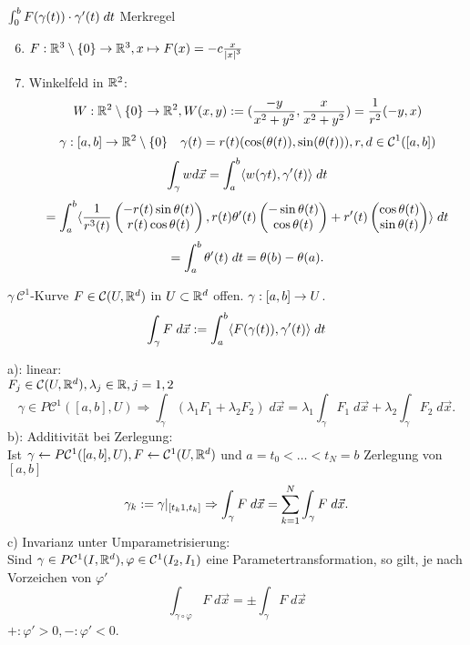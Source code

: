 \documentclass[../ana2.tex]{subfiles}
\begin{document}
\(\integralx{F(\gamma(t))\cdot \gamma'(t)}{0}{b}{t}\) Merkregel
\begin{bsp}\leavevmode
    \begin{enumerate}
        \setcounter{enumi}{5}
        \item \( \abb{F}{\R^3 \setminus \set{0}}{\R^3}, x \mapsto F(x) = -c \frac{x}{\abs{x}^3} \)
        \item Winkelfeld in \( \R^2 \): 
        \[ \abb{W}{\R^2 \setminus \set{0}}{\R^2}, W(x,y) 
        := (\frac{-y}{x^2 + y^2} , \frac{x}{x^2 + y^2}) 
        = \frac{1}{r^2} (-y, x) \]
        \[ \abb{\gamma}{[a,b]}{\R^2 \setminus \set{0}} \quad 
        \gamma(t) = r(t) (\cos(\theta(t)), \sin(\theta(t))), r, d \in \mathcal{C}^1([a,b]) \]
        \[ \int_\gamma w d \vec{x} = \integralx{\scalarprod{w(\gamma{t})}{\gamma'(t)}}{a}{b}{t} \]
        \[ = \integralx{\scalarprod{\frac{1}{r^3(t)} \begin{pmatrix}
            -r(t) \sin \theta(t) \\
            r(t) \cos \theta(t)
        \end{pmatrix}}{r(t)\theta'(t) \begin{pmatrix}
            -\sin \theta(t) \\
            \cos \theta(t)
        \end{pmatrix} + r'(t) \begin{pmatrix}
            \cos \theta(t) \\
            \sin \theta(t)
        \end{pmatrix}}}{a}{b}{t} \]
        \[ = \integralx{\theta'(t)}{a}{b}{t} = \theta(b) - \theta(a). \]
    \end{enumerate}
\end{bsp}
\( \gamma \ \mathcal{C}^1 \)-Kurve \( F \in \mathcal{C}(U, \R^d) \)
in \(U \subset \R^d\) offen. \( \abb{\gamma}{[a,b]}{U} \).
\[\integralx{F}{\gamma}{}{\vec{x}} 
:= \integralx{\scalarprod{F(\gamma(t))}{\gamma'(t)}}{a}{b}{t}\]
\begin{lem}
    a): linear: \\
    \( F_j \in \mathcal{C}(U, \R^d), \lambda_j \in \R, j = 1,2 \)
    \[ \gamma \in P\mathcal{C}^1([a,b], U) \Rightarrow 
    \int_\gamma (\lambda_1 F_1 + \lambda_2 F_2)\; d\vec{x} 
    = \lambda_1 \int_\gamma F_1\; d\vec{x} + \lambda_2 \int_\gamma F_2\; d\vec{x}. \]   
    b): Additivität bei Zerlegung:\\
    Ist \(\gamma \leftarrow P\mathcal{C}^1([a,b], U), F \leftarrow \mathcal{C}^1(U, \R^d) \)
    und \(a = t_0 < \ldots < t_N = b\) Zerlegung von \([a,b]\)
    \[\gamma_k := \gamma\vert_{[t_k1, t_k]}
    \Rightarrow \integralx{F}{\gamma}{}{\vec{x}}
    = \sum_{k=1}^N\integralx{F}{\gamma}{}{\vec{x}}.\]    
    c) Invarianz unter Umparametrisierung:\\
    Sind \(\gamma \in P\mathcal{C}^1(I,\R^d), \varphi \in \mathcal{C}^1(I_2, I_1)\)
    eine Parametertransformation, so gilt, je nach Vorzeichen von \(\varphi'\)
    \[ \int_{\gamma \circ \varphi} F \; d\vec{x} = \pm \int_\gamma F \; d\vec{x} \]
    \(+: \varphi' > 0, -: \varphi' < 0\).
\end{lem}
\end{document}
